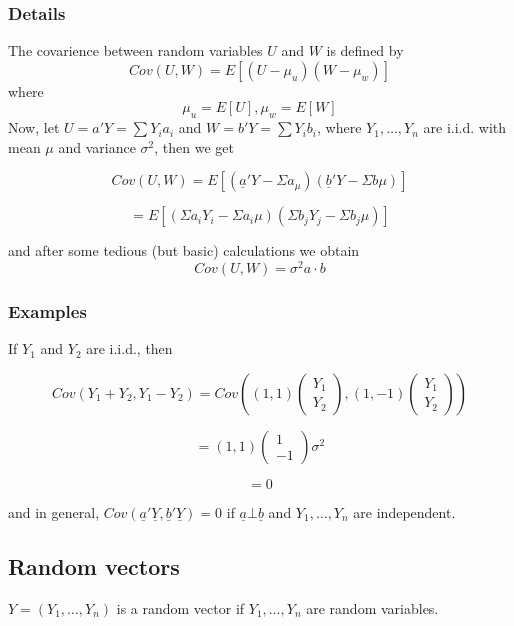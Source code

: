 \documentclass[12pt,a4paper]{article}
\theoremstyle{regla}
\theoremstyle{remark}
\theoremstyle{definition}
\theoremstyle{nonumberbreak}
\begin{document}
\subsubsection{Details}
The covarience between random variables $U$ and $W$ is defined by\\
$$Cov(U,W)= E[(U-\mu_u)(W-\mu_w)]$$
where 
$$\mu_u=E[U],\mu_w=E[W]$$
Now, let $U=a'Y=\sum Y_ia_i$ and $W=b'Y=\sum Y_ib_i$, where $Y_1,\ldots,Y_n$ are i.i.d. with mean $\mu$ and variance $\sigma^2$, then we get

$$Cov(U,W)= E[(\underline{a}'Y-\Sigma a_\mu)(\underline{b}'Y-\Sigma b\mu)]$$

$$= E[(\Sigma a_iY_i -\Sigma a_i\mu)(\Sigma b_jY_j -\Sigma b_j\mu )]$$

        

and after some tedious (but basic) calculations we obtain
$$Cov(U,W)=\sigma^2a\cdot b$$
\subsubsection{Examples}
\begin{xmpl}
If $Y_1$ and $Y_2$ are i.i.d., then

$$Cov(Y_1+Y_2, Y_1-Y_2)=Cov((1,1) \left( \begin{array}{ccc}Y_1  \\Y_2 \end{array} \right),  (1,-1) \left( \begin{array}{ccc}Y_1  \\Y_2 \end{array} \right) )$$

$$=(1,1) \left( \begin{array}{ccc} 1  \\-1 \end{array} \right)\sigma^2 $$

$$=0 $$

and in general, $Cov(\underline{a}'\underline{Y}, \underline{b}'\underline{Y})=0$ if $\underline{a}\bot \underline{b}$ and $Y_1,\ldots,Y_n$ are independent.
\end{xmpl}


\subsection{Random vectors}
\begin{fbox}
\begin{minipage}{0.97\textwidth}
$Y= (Y_1, \ldots , Y_n)$ is a random vector if $Y_1, \ldots , Y_n$ are random variables.
\end{minipage}
\end{fbox}
\end{document}
